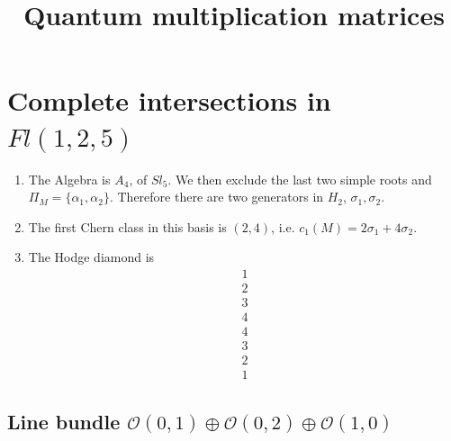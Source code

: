 \documentclass[11pt]{amsart}
\title{Quantum multiplication matrices}
\author{}
\date{}
\newcounter{num}[section] %
\begin{document}
\maketitle
\tableofcontents
\section{Complete intersections in $Fl(1,2,5)$}

\begin{enumerate}
    \item [1)]The Algebra is $A_4$, of $Sl_5$. We then exclude the last two simple roots and $\Pi_M = \{\alpha_1 , \alpha_2\}$. Therefore there are two generators in $H_2$, $\sigma_{1}, \sigma_2$.
    \item[2)] The first Chern class in this basis is $(2,4)$, i.e. $c_1 (M) = 2 \sigma_1 +4\sigma_2$.
    \item[3)]The Hodge diamond is
    \[
        \begin{array}{c}
             1  \\
             2\\
             3\\
             4\\
             4\\
            3\\
            2\\
            1
        \end{array}
    \]
\end{enumerate}


\subsection{Line bundle $\mathcal{O}(0,1) \oplus \mathcal{O}(0,2) \oplus \mathcal{O}(1,0)$}
\end{document}
